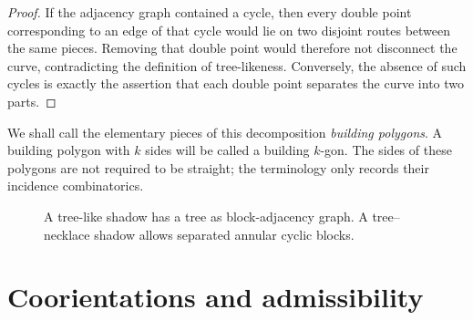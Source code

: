 \documentclass[11pt]{article}
\begin{document}
\begin{proof}
If the adjacency graph contained a cycle, then every double point corresponding to an edge of that cycle would lie on two disjoint routes between the same pieces.  Removing that double point would therefore not disconnect the curve, contradicting the definition of tree-likeness.  Conversely, the absence of such cycles is exactly the assertion that each double point separates the curve into two parts.
\end{proof}

We shall call the elementary pieces of this decomposition \emph{building polygons}.  A building polygon with $k$ sides will be called a building $k$-gon.  The sides of these polygons are not required to be straight; the terminology only records their incidence combinatorics.

\begin{figure}[t]
\centering
{}
\caption{A tree-like shadow has a tree as block-adjacency graph.  A tree--necklace shadow allows separated annular cyclic blocks.}
\label{fig:block-graphs}
\end{figure}

\section{Coorientations and admissibility}
\end{document}
